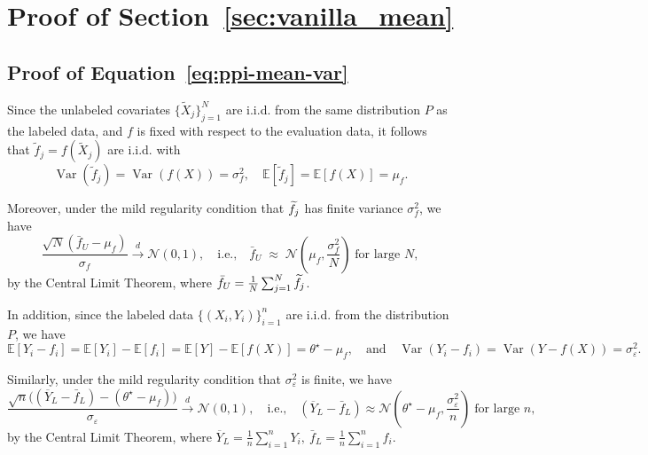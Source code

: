\appendix
{} %
\section{Proof of Section~\ref{sec:vanilla_mean}}

\subsection{Proof of Equation~\eqref{eq:ppi-mean-var}}
Since the unlabeled covariates $\{\widetilde{X}_j\}_{j=1}^N$ are i.i.d. from the same distribution $P$ as the labeled data, and $f$ is fixed with respect to the evaluation data, it follows that $\widetilde{f}_j = f(\widetilde{X}_j)$ are i.i.d. with
\[\operatorname{Var}\!\left(\widetilde{f}_j\right) = \operatorname{Var}\left(f(X)\right)=\sigma_f^2,
\quad
\mathbb{E}\!\left[\widetilde{f}_j\right] =\mathbb{E}[f(X)]= \mu_f.\]

\noindent Moreover, under the mild regularity condition that $\widetilde{f}_j$ has finite variance $\sigma_f^2$, we have\[\frac{\sqrt{N}\left(\bar f_U-\mu_f\right)}{\sigma_f}\overset{d}{\longrightarrow}\mathcal{N}(0,1),\quad\text{i.e.,}\quad \bar f_U\;\approx\;\mathcal{N}\left(\mu_f,\frac{\sigma_f^2}{N}\right)\;\text{for large $N$},\] by the Central Limit Theorem, where $\bar f_U=\frac{1}{N}\sum^N_{j=1}\widetilde{f}_j$. 


\noindent In addition, since the labeled data $\{(X_i, Y_i)\}_{i=1}^n$ are i.i.d. from the distribution $P$, we have
\[\mathbb{E}\!\left[Y_i - f_i\right]
= \mathbb{E}[Y_i] - \mathbb{E}[f_i]
= \mathbb{E}[Y] - \mathbb{E}[f(X)]
= \theta^\star - \mu_f,
\quad \text{and} \quad
\operatorname{Var}\!\left(Y_i - f_i\right)
= \operatorname{Var}\!\left(Y - f(X)\right)
= \sigma_\varepsilon^2.\]

\noindent Similarly, under the mild regularity condition that $\sigma^2_\varepsilon$ is finite, we have
\[
\frac{\sqrt{n}\Bigg(\left(\overline{Y}_L- \bar f_L\right)-
\left(\theta^\star-\mu_f\right)\Bigg)}{\sigma_\varepsilon}\overset{d}{\longrightarrow}\mathcal{N}(0,1),
\quad\text{i.e.,}\quad 
\left(\overline{Y}_L- \bar f_L\right)\approx\mathcal{N}\left(\theta^\star-\mu_f,\frac{\sigma_\varepsilon^2}{n}\right)\;\text{for large $n$},
\] by the Central Limit Theorem, where $\overline{Y}_L =\frac{1}{n}\sum_{i=1}^n Y_i,\ \bar f_L=\frac{1}{n}\sum_{i=1}^n f_i$.

